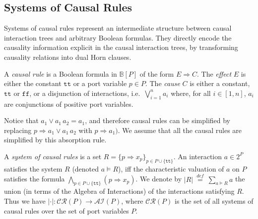 \documentclass{llncs}
\newcommand{\secn}[1]{Sect.~\ref{secn:#1}}
\newcommand{\sB}{\ensuremath{\mathbb{B}}}
\newcommand{\mdash}[1][]{---#1}
\newcommand{\ie}[1][\ ]{i.e.#1}
\newcommand{\bydef}[1]{\ensuremath{\stackrel{\mathit{\scriptscriptstyle def}}{#1}}}
\newcommand{\true} {\ensuremath{\mathtt{t\!t}}}
\newcommand{\false}{\ensuremath{\mathtt{f\!f}}}
\newcommand{\ai}{\ensuremath{\mathcal{AI}}}
\newcommand{\cru}{\ensuremath{\mathcal{CR}}}
\begin{document}
\subsection{Systems of Causal Rules}
\label{secn:rules}

Systems of causal rules represent an intermediate structure between
causal interaction trees and arbitrary Boolean formulas.  They
directly encode the causality information explicit in the causal
interaction trees, by transforming causality relations into dual Horn
clauses. %

\begin{definition}
  A {\em causal rule} is a Boolean formula in $\sB[P]$ of the form $E
  \Rightarrow C$.  The \emph{effect} $E$ is either the constant
  $\true$ or a port variable $p \in P$.  The \emph{cause} $C$ is
  either a constant, $\true$ or $\false$, or a disjunction of
  interactions, \ie $\bigvee_{i=1}^n a_i$ where, for all $i\in [1,n]$,
  $a_i$ are conjunctions of positive port variables.
\end{definition}

\begin{note} \label{rem:absorption}
  Notice that $a_1 \lor a_1\,a_2 = a_1$, and therefore causal rules
  can be simplified by replacing $p \Rightarrow a_1 \lor a_1\,a_2$
  with $p \Rightarrow a_1)$.  We assume that all the causal rules are
  simplified by this absorption rule.
\end{note}

\begin{definition}
  A \emph{system of causal rules} is a set $R = \{p \Rightarrow
  x_p\}_{p\in P\cup \{\true\}}$.  An interaction $a \in 2^P$ satisfies
  the system $R$ (denoted $a \models R$), iff the characteristic
  valuation of $a$ on $P$ satisfies the formula $\bigwedge_{p\in P\cup
    \{\true\}} (p \Rightarrow x_p)$.  We denote by
  $|R|\ \bydef{=}\ \sum_{a \models R} a$ the union (in terms of the
  Algebra of Interactions) of the interactions satisfying $R$.  Thus
  we have $|\cdot| : \cru(P) \rightarrow \ai(P)$, where $\cru(P)$ is
  the set of all systems of causal rules over the set of port
  variables $P$.
\end{definition}
\end{document}

